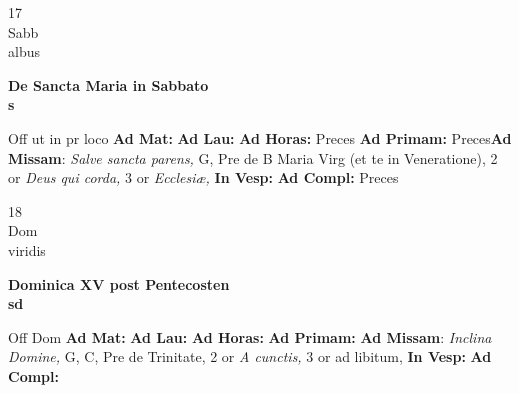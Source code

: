 \documentclass[10pt, openany]{book}
\begin{document}
    \begin{center}
        \begin{minipage}{3.5in}
            \vspace{2em}
            \begin{minipage}{0.5in}
                {\Huge 17} \\
                {\normalsize Sabb} \\
                {\normalsize albus}
            \end{minipage}
            \begin{minipage}{3.0in}
                \textbf{ \large De Sancta Maria in Sabbato \\
                \textnormal{\normalsize s}} \\ 
            \end{minipage}
            \begin{justify}Off ut in pr loco
                \textbf{Ad Mat: }
                \textbf{Ad Lau: }
                \textbf{Ad Horas: }Preces
                \textbf{Ad Primam: }Preces\textbf{Ad Missam}: \textit{Salve sancta parens,} G, Pre de B Maria Virg (et te in Veneratione), 2 or \textit{Deus qui corda,} 3 or \textit{Ecclesiæ,}  
                \textbf{In Vesp: }
                \textbf{Ad Compl: }Preces
            \end{justify}
        \end{minipage}
    \end{center}

    \begin{center}
        \begin{minipage}{3.5in}
            \vspace{2em}
            \begin{minipage}{0.5in}
                {\Huge 18} \\
                {\normalsize Dom} \\
                {\normalsize viridis}
            \end{minipage}
            \begin{minipage}{3.0in}
                \textbf{ \large Dominica XV post Pentecosten \\
                \textnormal{\normalsize sd}} \\ 
            \end{minipage}
            \begin{justify}Off Dom
                \textbf{Ad Mat: }
                \textbf{Ad Lau: }
                \textbf{Ad Horas: }
                \textbf{Ad Primam: }\textbf{Ad Missam}: \textit{Inclina Domine,} G, C, Pre de Trinitate, 2 or \textit{A cunctis,} 3 or ad libitum,  
                \textbf{In Vesp: }
                \textbf{Ad Compl: }
            \end{justify}
        \end{minipage}
    \end{center}
\end{document}
